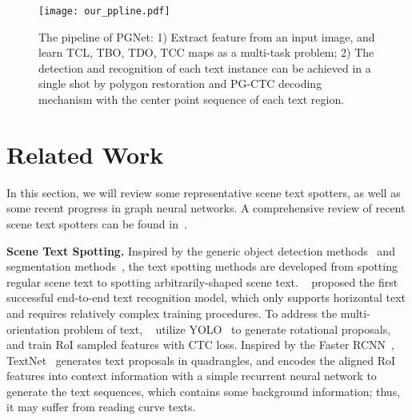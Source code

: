 \documentclass[letterpaper]{article} \usepackage{aaai21}  \usepackage{times}  \usepackage{helvet} \usepackage{courier}  \usepackage[hyphens]{url}  \usepackage{graphicx} \urlstyle{rm} \def\UrlFont{\rm}  \usepackage{natbib}  \usepackage{caption} \usepackage{bm}
\begin{document}
\begin{figure*}
    \centering
    \texttt{[image: our\_ppline.pdf]}
    \caption{The pipeline of PGNet: 1) Extract feature from an input image, and learn TCL, TBO, TDO, TCC maps as a multi-task problem; 2) The detection and recognition of each text instance can be achieved in a single shot by polygon restoration and PG-CTC decoding mechanism with the center point sequence of each text region.}
    \label{fig:pipeline}
\end{figure*}


\section{Related Work}
In this section, we will review some representative scene text spotters, as well as some recent progress in graph neural networks. A comprehensive review of recent scene text spotters can be found in~\cite{ye2015text, zhu2016scene, baek2019wrong, liao2019mask}.

\textbf{Scene Text Spotting.} Inspired by the generic object detection methods~\cite{Liu2016SSDSS,ren2015faster,redmon2016yolo} and segmentation methods~\cite{he2017mask, milletari2016v}, the text spotting methods are developed from spotting regular scene text to spotting arbitrarily-shaped scene text. \citeauthor{lee2016recursive}~ proposed the first successful end-to-end text recognition model, which only supports horizontal text and requires relatively complex training procedures. To address the multi-orientation problem of text, \citeauthor{busta2017deep}~ utilize YOLO~\cite{redmon2016yolo} to generate rotational proposals, and train RoI sampled features with CTC loss. Inspired by the Faster RCNN~\cite{ren2015faster}, TextNet~\cite{sun2018textnet} generates text proposals in quadrangles, and encodes the aligned RoI features into context information with a simple recurrent neural network to generate the text sequences, which contains some background information; thus, it may suffer from reading curve texts. 
\end{document}
